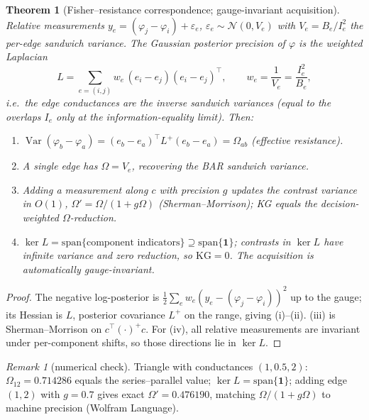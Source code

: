 \documentclass[11pt]{article}
\theoremstyle{plain}
\newtheorem{theorem}{Theorem}
\theoremstyle{remark}
\newtheorem{remark}{Remark}
\DeclareMathOperator{\Var}{Var}
\begin{document}
\begin{theorem}[Fisher--resistance correspondence; gauge-invariant acquisition]\label{thm:fr}
Relative measurements $y_e=(\varphi_j-\varphi_i)+\varepsilon_e$, $\varepsilon_e\sim\mathcal N(0,V_e)$ with $V_e=B_e/I_e^2$ the per-edge sandwich variance. The Gaussian posterior precision of $\varphi$ is the weighted Laplacian
\[
L=\sum_{e=(i,j)} w_e\,(e_i-e_j)(e_i-e_j)^\top,\qquad w_e=\frac1{V_e}=\frac{I_e^2}{B_e},
\]
i.e.\ the edge conductances are the \emph{inverse sandwich variances} (equal to the overlaps $I_e$ only at the information-equality limit). Then:
\begin{enumerate}[label=(\roman*),leftmargin=2.2em,itemsep=1pt]
\item $\Var(\varphi_b-\varphi_a)=(e_b-e_a)^\top L^{+}(e_b-e_a)=\Omega_{ab}$ (effective resistance).
\item A single edge has $\Omega=V_e$, recovering the BAR sandwich variance.
\item Adding a measurement along $c$ with precision $g$ updates the contrast variance in $O(1)$, $\Omega'=\Omega/(1+g\Omega)$ (Sherman--Morrison); KG equals the decision-weighted $\Omega$-reduction.
\item $\ker L=\mathrm{span}\{\text{component indicators}\}\supseteq\mathrm{span}\{\mathbf1\}$; contrasts in $\ker L$ have infinite variance and zero reduction, so $\mathrm{KG}=0$. The acquisition is automatically gauge-invariant.
\end{enumerate}
\end{theorem}
\begin{proof}
The negative log-posterior is $\tfrac12\sum_e w_e(y_e-(\varphi_j-\varphi_i))^2$ up to the gauge; its Hessian is $L$, posterior covariance $L^{+}$ on the range, giving (i)--(ii). (iii) is Sherman--Morrison on $c^\top(\cdot)^{+}c$. For (iv), all relative measurements are invariant under per-component shifts, so those directions lie in $\ker L$.
\end{proof}
\begin{remark}[numerical check]
Triangle with conductances $(1,0.5,2)$: $\Omega_{12}=0.714286$ equals the series--parallel value; $\ker L=\mathrm{span}\{\mathbf1\}$; adding edge $(1,2)$ with $g=0.7$ gives exact $\Omega'=0.476190$, matching $\Omega/(1+g\Omega)$ to machine precision (Wolfram Language).
\end{remark}
\end{document}
